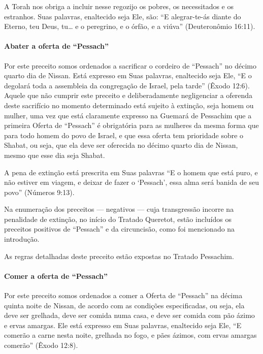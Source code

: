 A Torah nos obriga a incluir nesse regozijo os pobres, os necessitados
e os estranhos. Suas palavras, enaltecido seja Ele, são: ``E
alegrar-te-ás diante do Eterno, teu Deus, tu\ldots{} e o peregrino, e o
órfão, e a viúva'' (Deuteronômio 16:11).

\paragraph{Abater a oferta de ``Pessach''}

Por este preceito somos ordenados a sacrificar o cordeiro de ``Pessach''
no décimo quarto dia de Nissan. Está expresso em Suas palavras,
enaltecido seja Ele, ``E o degolará toda a assembleia da congregação de
Israel, pela tarde'' (Êxodo 12:6). Aquele que não cumprir este preceito
e deliberadamente negligenciar a oferenda deste sacrifício no momento
determinado está sujeito à extinção, seja homem ou mulher, uma vez que
está claramente expresso na Guemará de Pessachim que a primeira Oferta
de ``Pessach'' é obrigatória para as mulheres da mesma forma que para
todo homem do povo de Israel, e que essa oferta tem prioridade sobre o
Shabat, ou seja, que ela deve ser oferecida no décimo quarto dia de
Nissan, mesmo que esse dia seja Shabat.

A pena de extinção está prescrita em Suas palavras ``E o homem que está
puro, e não estiver em viagem, e deixar de fazer o `Pessach', essa alma
será banida de seu povo'' (Números 9:13).

Na enumeração dos preceitos --- negativos --- cuja transgressão incorre
na penalidade de extinção, no início do Tratado Queretot, estão
incluídos os preceitos positivos de ``Pessach'' e da circuncisão, como
foi mencionado na introdução.

As regras detalhadas deste preceito estão expostas no Tratado Pessachim.

\paragraph{Comer a oferta de ``Pessach''}

Por este preceito somos ordenados a comer a Oferta de ``Pessach'' na
décima quinta noite de Nissan, de acordo com as condições especificadas,
ou seja, ela deve ser grelhada, deve ser comida numa casa, e deve ser
comida com pão ázimo e ervas amargas. Ele está expresso em Suas
palavras, enaltecido seja Ele, ``E comerão a carne nesta noite, grelhada
no fogo, e pães ázimos, com ervas amargas comerão'' (Êxodo 12:8).

